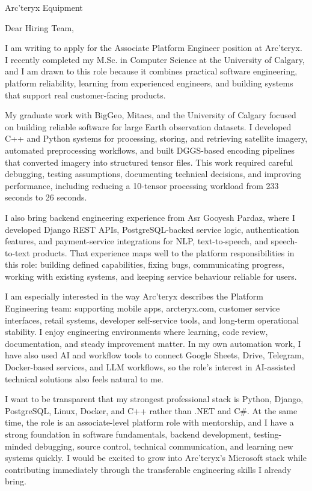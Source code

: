 \documentclass[11pt]{letter}
\begin{document}
\begin{letter}{Arc'teryx Equipment}

\opening{Dear Hiring Team,}

I am writing to apply for the Associate Platform Engineer position at Arc'teryx. I recently completed my M.Sc. in Computer Science at the University of Calgary, and I am drawn to this role because it combines practical software engineering, platform reliability, learning from experienced engineers, and building systems that support real customer-facing products.

My graduate work with BigGeo, Mitacs, and the University of Calgary focused on building reliable software for large Earth observation datasets. I developed C++ and Python systems for processing, storing, and retrieving satellite imagery, automated preprocessing workflows, and built DGGS-based encoding pipelines that converted imagery into structured tensor files. This work required careful debugging, testing assumptions, documenting technical decisions, and improving performance, including reducing a 10-tensor processing workload from 233 seconds to 26 seconds.

I also bring backend engineering experience from Asr Gooyesh Pardaz, where I developed Django REST APIs, PostgreSQL-backed service logic, authentication features, and payment-service integrations for NLP, text-to-speech, and speech-to-text products. That experience maps well to the platform responsibilities in this role: building defined capabilities, fixing bugs, communicating progress, working with existing systems, and keeping service behaviour reliable for users.

I am especially interested in the way Arc'teryx describes the Platform Engineering team: supporting mobile apps, arcteryx.com, customer service interfaces, retail systems, developer self-service tools, and long-term operational stability. I enjoy engineering environments where learning, code review, documentation, and steady improvement matter. In my own automation work, I have also used AI and workflow tools to connect Google Sheets, Drive, Telegram, Docker-based services, and LLM workflows, so the role's interest in AI-assisted technical solutions also feels natural to me.

I want to be transparent that my strongest professional stack is Python, Django, PostgreSQL, Linux, Docker, and C++ rather than .NET and C\#. At the same time, the role is an associate-level platform role with mentorship, and I have a strong foundation in software fundamentals, backend development, testing-minded debugging, source control, technical communication, and learning new systems quickly. I would be excited to grow into Arc'teryx's Microsoft stack while contributing immediately through the transferable engineering skills I already bring.


\end{letter}
\end{document}
